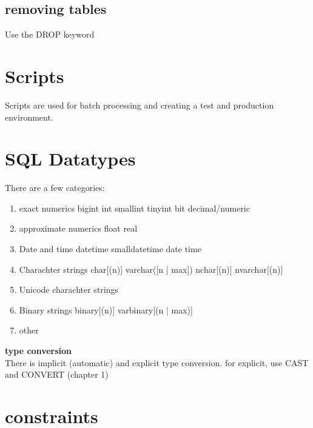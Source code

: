 \documentclass{report}
\begin{document}
	\subsection{removing tables}
	Use the DROP keyword
	\section{Scripts}
	Scripts are used for batch processing and creating a test and production environment.
	\section{SQL Datatypes}
	There are a few categories:
	\begin{enumerate}
		\item exact numerics
		\subitem bigint
		\subitem int
		\subitem smallint
		\subitem tinyint
		\subitem bit
		\subitem decimal/numeric
		\item approximate numerics
		\subitem float
		\subitem real
		
		\item Date and time
		\subitem datetime
		\subitem smalldatetime
		\subitem date
		\subitem time
		\item Charachter strings
		\subitem char[(n)]
		\subitem varchar([n | max])
		\subitem nchar[(n)]
		\subitem nvarchar[(n)]
		\item Unicode charachter strings
		\item Binary strings
		\subitem binary[(n)]
		\subitem varbinary[(n | max)]
		\item other
	\end{enumerate}	
	\textbf{type conversion}\\
	There is implicit (automatic) and explicit type conversion. for explicit, use CAST and CONVERT (chapter 1)
	\section{constraints}
\end{document}

